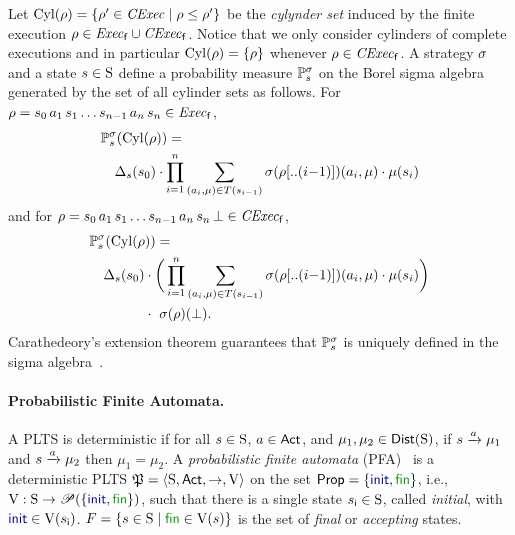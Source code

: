 Let $\Cyl(\rho)=\{\rho'\in\cexec\mid{\rho\leq\rho'}\}$ be the
\emph{cylynder set} induced by the finite execution
$\rho\in\execf\cup\cexecf$.  Notice that we only consider cylinders of
complete executions and in particular $\Cyl(\rho)=\{\rho\}$ whenever
$\rho\in\cexecf$.
%
A strategy $\strat$ and a state $s\in\S$ define a probability
measure $\Prob^\strat_s$ on the Borel sigma algebra generated by the
set of all cylinder sets as follows. 
%
For $\rho = s_0\, a_1\, s_1\ldots s_{n-1}\, a_n\, s_n \in \execf$,
%
\begin{align}
  &\Prob^\strat_s(\Cyl(\rho)) = {}\label{eq:def:prob:i}\\
  &\quad \Dirac_s(s_0)\cdot\prod\limits_{i=1}^n\sum\limits_{(a_i,\mu)\in T(s_{i-1})}\strat(\rho[..(i{-}1)])(a_i,\mu)\cdot\mu(s_i)\notag
\end{align}
%
and for
$\rho = s_0\, a_1\, s_1\ldots s_{n-1}\, a_n\, s_n\, \complete \in \cexecf$,
%
\begin{align}
  &\Prob^\strat_s(\Cyl(\rho)) = {}\label{eq:def:prob:ii}\\
  &\quad \Dirac_s(s_0)\cdot\bigg(\prod\limits_{i=1}^n\sum\limits_{(a_i,\mu)\in T(s_{i-1})}\strat(\rho[..(i{-}1)])(a_i,\mu)\cdot\mu(s_i)\bigg)\notag\\
  &\phantom{\quad \Dirac_s(s_0)} \cdot \ \strat(\rho)(\complete).\notag
\end{align}
%
Carathedeory's extension theorem guarantees that $\Prob^\strat_s$ is
uniquely defined in the sigma algebra~\cite{Segala95}.




\paragraph{Probabilistic Finite Automata.} A PLTS is deterministic if for all $s\in\S$, $a\in\Act$, and
$\mu_1,\mu_2\in\Dist(\S)$, if $s\reach{a}\mu_1$ and $s\reach{a}\mu_2$
then $\mu_1=\mu_2$.
%
A \emph{probabilistic finite automata} (PFA)~\cite{Rabin63,Paz71} is a
deterministic PLTS $\pfa=\tup{\S,\Act,\ra,\V}$ on the set
$\Prop=\{\init,\fin\}$, i.e., $\V:\S\to\powerset(\{\init,\fin\})$,
such that there is a single state $\sini\in\S$, called
\emph{initial}, with $\init\in\V(\sini)$.
%
$F=\{{s\in\S}\mid{\fin\in\V(s)}\}$ is the set of \emph{final} or
\emph{accepting} states.

